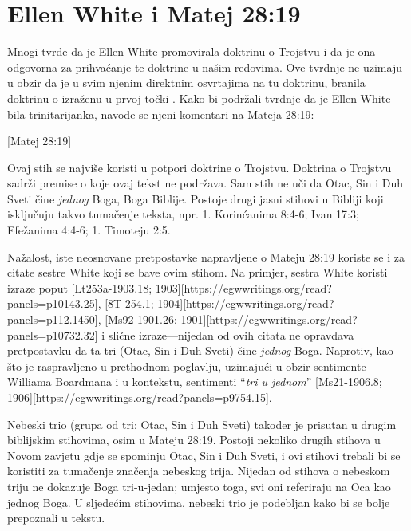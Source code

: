 \chapter{Ellen White i Matej 28:19}

Mnogi tvrde da je Ellen White promovirala doktrinu o Trojstvu i da je ona odgovorna za prihvaćanje te doktrine u našim redovima. Ove tvrdnje ne uzimaju u obzir da je u svim njenim direktnim osvrtajima na tu doktrinu, branila  doktrinu o  izraženu u prvoj točki . Kako bi podržali tvrdnje da je Ellen White bila trinitarijanka, navode se njeni komentari na Mateja 28:19:

[Matej 28:19]

Ovaj stih se najviše koristi u potpori doktrine o Trojstvu. Doktrina o Trojstvu sadrži premise o  koje ovaj tekst ne podržava. Sam stih ne uči da Otac, Sin i Duh Sveti čine \textit{jednog} Boga, Boga Biblije. Postoje drugi jasni stihovi u Bibliji koji isključuju takvo tumačenje teksta, npr. 1. Korinćanima 8:4-6; Ivan 17:3; Efežanima 4:4-6; 1. Timoteju 2:5.

Nažalost, iste neosnovane pretpostavke napravljene o Mateju 28:19 koriste se i za citate sestre White koji se bave ovim stihom. Na primjer, sestra White koristi izraze poput [Lt253a-1903.18; 1903][https://egwwritings.org/read?panels=p10143.25], [8T 254.1; 1904][https://egwwritings.org/read?panels=p112.1450], [Ms92-1901.26: 1901][https://egwwritings.org/read?panels=p10732.32] i slične izraze—nijedan od ovih citata ne opravdava pretpostavku da ta tri (Otac, Sin i Duh Sveti) čine \textit{jednog} Boga. Naprotiv, kao što je raspravljeno u prethodnom poglavlju, uzimajući u obzir sentimente Williama Boardmana i  u kontekstu, sentimenti “\textit{tri u jednom}” [Ms21-1906.8; 1906][https://egwwritings.org/read?panels=p9754.15].

Nebeski trio (grupa od tri: Otac, Sin i Duh Sveti) također je prisutan u drugim biblijskim stihovima, osim u Mateju 28:19. Postoji nekoliko drugih stihova u Novom zavjetu gdje se spominju Otac, Sin i Duh Sveti, i ovi stihovi trebali bi se koristiti za tumačenje značenja nebeskog trija. Nijedan od stihova o nebeskom triju ne dokazuje Boga tri-u-jedan; umjesto toga, svi oni referiraju na Oca kao jednog Boga. U sljedećim stihovima, nebeski trio je podebljan kako bi se bolje prepoznali u tekstu.

